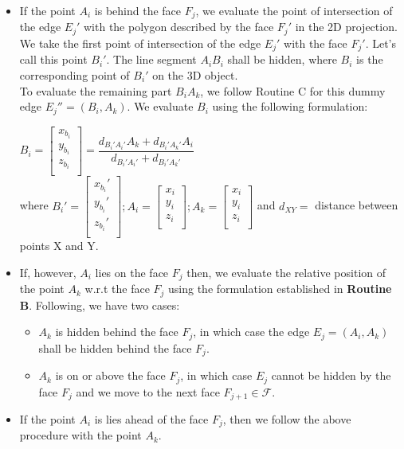 \documentclass[12pt]{report}
\begin{document}
\begin{itemize}[nolistsep,noitemsep]
\item If the point \(A_{i}\) is behind the face \(F_{j}\), we evaluate the point of intersection of the edge \(E_{j}'\) with the polygon described by the face \(F_{j}'\) in the 2D projection. \\
We take the first point of intersection of the edge \(E_{j}'\) with the face \(F_{j}'\). Let's call this point \(B_{i}'\). The line segment \(A_{i}\)\(B_{i}\) shall be hidden, where \(B_{i}\) is the corresponding point of \(B_{i}'\) on the 3D object. \\
To evaluate the remaining part \(B_{i}\)\(A_{k}\), we follow Routine C for this dummy edge \(E_{j}'' = (B_{i},A_{k}) \). We evaluate \(B_{i}\) using the following formulation: \\
\begin{center}
\centering
\( B_{i} = \begin{bmatrix}  x_{b_{i}} \\ y_{b_{i}} \\ z_{b_{i}} \\ \end{bmatrix} = \dfrac{d_{B_{i}'A_{i}'}A_{k} + d_{B_{i}'A_{k}'}A_{i}}{d_{B_{i}'A_{i}'} + d_{B_{i}'A_{k}'}} \) \\
where \( B_{i}' = \begin{bmatrix}  x_{b_{i}}' \\ y_{b_{i}}' \\ z_{b_{i}}' \\ \end{bmatrix}; A_{i} = \begin{bmatrix}  x_{i} \\ y_{i} \\ z_{i} \\ \end{bmatrix}; A_{k} = \begin{bmatrix}  x_{i} \\ y_{i} \\ z_{i} \\ \end{bmatrix}\) and \( d_{XY} = \) distance between points X and Y.
\end{center}
\item If, however, \(A_{i}\) lies on the face \(F_{j}\) then, we evaluate the relative position of the point \(A_{k}\) w.r.t the face \(F_{j}\) using the formulation established in \textbf{Routine B}. Following, we have two cases:
\begin{itemize}[nolistsep,noitemsep]
\item \(A_{k}\) is hidden behind the face \(F_{j}\), in which case the edge \(E_{j} = (A_{i},A_{k}) \) shall be hidden behind the face \(F_{j}\).
\item \(A_{k}\) is on or above the face \(F_{j}\), in which case \(E_{j}\) cannot be hidden by the face \(F_{j}\) and we move to the next face \(F_{j+1} \in \mathcal{F}\).
\end{itemize}
\item If the point \(A_{i}\) is lies ahead of the face \(F_{j}\), then we follow the above procedure with the point \(A_{k}\).
\end{itemize}
\end{document}

